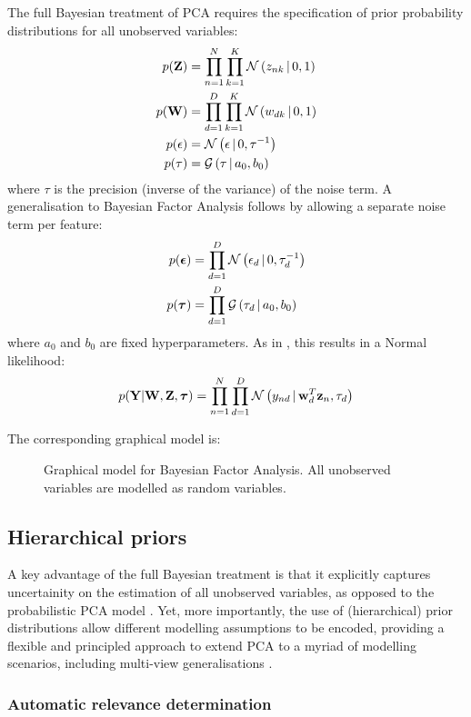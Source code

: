 The full Bayesian treatment of PCA requires the specification of prior probability distributions for all unobserved variables:
\begin{align*}
	p({\bf Z}) &= \prod_{n=1}^{N} \prod_{k=1}^{K} \mathcal{N}\left(z_{nk} \,|\, 0,1\right) \\
	p({\bf W}) &= \prod_{d=1}^{D} \prod_{k=1}^{K} \mathcal{N}\left(w_{dk} \,|\, 0,1\right) \\
	p(\epsilon) &= \mathcal{N}\left(\epsilon \,|\, 0,\tau^{-1}\right) \\
	p(\tau) &= \mathcal{G}\left(\tau \,|\, a_0,b_0\right)
\end{align*}
where $\tau$ is the precision (inverse of the variance) of the noise term. A generalisation to Bayesian Factor Analysis follows by allowing a separate noise term per feature:
\begin{align*}
	p(\mbox{\boldmath $\epsilon$}) &= \prod_{d=1}^{D} \mathcal{N}\left(\epsilon_d \,|\, 0,\tau_d^{-1}\right) \\
	p(\mbox{\boldmath $\tau$}) &= \prod_{d=1}^{D} \mathcal{G}\left(\tau_d \,|\, a_0,b_0\right)
\end{align*}
where $a_0$ and $b_0$ are fixed hyperparameters. As in , this results in a Normal likelihood:
\[
	p({\bf Y}|{\bf W},{\bf Z},\mbox{\boldmath $\tau$}) = \prod_{n=1}^{N} \prod_{d=1}^{D} \mathcal{N}\left(y_{nd} \,|\, {\bf w}_{d}^T {\bf z}_{n},\tau_d\right)
\]

The corresponding graphical model is:

\begin{figure}[H] 
	\centering
	
	\caption{Graphical model for Bayesian Factor Analysis. All unobserved variables are modelled as random variables.}
	\label{fig:bayesianFA}
\end{figure}


\subsection{Hierarchical priors}  \label{section:hierarchical_priors}

A key advantage of the full Bayesian treatment is that it explicitly captures uncertainity on the estimation of all unobserved variables, as opposed to the probabilistic PCA model \cite{Bishop1999a,Bishop1999b}. Yet, more importantly, the use of (hierarchical) prior distributions allow different modelling assumptions to be encoded, providing a flexible and principled approach to extend PCA to a myriad of modelling scenarios, including multi-view generalisations \cite{Klami2008,Virtanen2012,Klami2015,Bunte2016,Khan2014,Zhao2016}.

\subsubsection{Automatic relevance determination} \label{section:ard}


